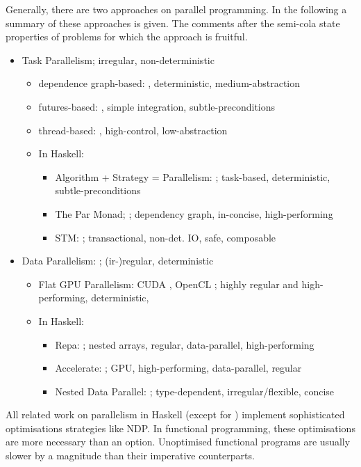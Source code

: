   Generally, there are two approaches on parallel programming.
  In the following a summary of these approaches is given. The
  comments after the semi-cola state properties of problems
  for which the approach is fruitful.
  \begin{itemize}
    \item Task Parallelism; irregular, non-deterministic
    \begin{itemize}
      \item dependence graph-based: \cite{GenTaskPar2015}, deterministic, medium-abstraction
      \item futures-based: \cite{FutPar2012}, simple integration, subtle-preconditions 
      \item thread-based: \cite{POXISthreads1997}, high-control, low-abstraction
      \item In Haskell: \cite{Marlow2012Parallel}
      \begin{itemize}
        \item Algorithm + Strategy = Parallelism: \cite{Trinder1998Algorithm}; task-based, deterministic, subtle-preconditions
        \item The Par Monad; \cite{Marlow2011Monad}; dependency graph, in-concise, high-performing
        \item STM: \cite{Harris2005Composable}; transactional, non-det. IO, safe, composable
      \end{itemize}
    \end{itemize}
    \item Data Parallelism: \cite{DataParallel1986}; (ir-)regular, deterministic
    \begin{itemize}
      \item Flat GPU Parallelism: CUDA \cite{CUDA2008}, OpenCL \cite{OpenCL2010}; highly regular and high-performing, deterministic, 
      \item In Haskell: \cite{Marlow2012Parallel}
      \begin{itemize}
          \item Repa: \cite{Keller2010Regular}; nested arrays, regular, data-parallel, high-performing
          \item Accelerate: \cite{McDonell2013Optimising}; GPU, high-performing, data-parallel, regular
          \item Nested Data Parallel: \cite{Harness2008}; type-dependent, irregular/flexible, concise
      \end{itemize}
    \end{itemize}
  \end{itemize}
  All related work on parallelism in Haskell (except for \cite{Marlow2011Monad})
  implement sophisticated optimisations strategies like NDP. In
  functional programming, these optimisations are more necessary than an option.
  Unoptimised functional programs are usually slower by a magnitude than their imperative counterparts.
  
